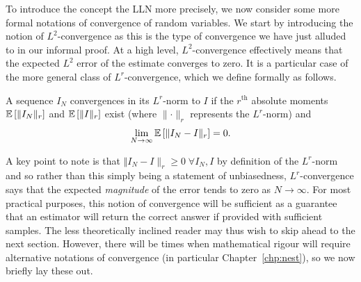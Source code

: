 To introduce the concept the LLN more precisely, we now consider some more formal notations
of convergence of random variables.  We start by introducing the notion of $L^2$-convergence
as this is the type of convergence we have just alluded to in our informal proof.
At a high level, $L^2$-convergence effectively means that the expected $L^2$ error 
of the estimate converges to zero.  It is a particular case of the more general class of
$L^r$-convergence, which we define formally as follows.
\begin{definition}
A sequence $I_N$ convergences in its $L^r$-norm to $I$ if the $r^{\text{th}}$ absolute moments
$\mathbb{E} \left[\lVert I_N\rVert_r\right]$ and $\mathbb{E} \left[\lVert I\rVert_r\right]$ exist 
(where $\lVert \cdot \rVert_r$ represents the $L^r$-norm) and
\begin{align}
\lim\limits_{N\rightarrow\infty} \mathbb{E} \left[\Vert I_N-I\rVert_r\right]=0.
\end{align}
\end{definition}
A key point to note is that $\Vert I_N-I\rVert_r\ge0 \; \forall I_N, I$ by definition of the $L^r$-norm and so
rather than this simply being a statement of unbiasedness, $L^r$-convergence says that the expected
\emph{magnitude} of the error tends to zero as $N\rightarrow\infty$.  For most practical
purposes, this notion of convergence will be sufficient as a guarantee that an estimator will
return the correct answer if provided with sufficient samples.  The less theoretically
inclined reader may thus wish to skip ahead to the next section.  However, there will be times
when mathematical rigour will require alternative notations of convergence
(in particular Chapter~\ref{chp:nest}), so we now briefly lay these out.

